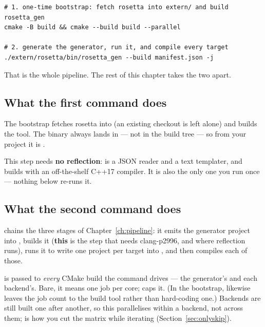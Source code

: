 \begin{lstlisting}[style=sh]
# 1. one-time bootstrap: fetch rosetta into extern/ and build rosetta_gen
cmake -B build && cmake --build build --parallel

# 2. generate the generator, run it, and compile every target
./extern/rosetta/bin/rosetta_gen --build manifest.json -j
\end{lstlisting}

That is the whole pipeline. The rest of this chapter takes the two apart.

\subsection*{What the first command does}

The bootstrap  fetches rosetta into  (an
existing checkout is left alone) and builds the  tool. The
binary always lands in  --- not in the build
tree --- so from your project it is .

This step needs \textbf{no reflection}:  is a JSON reader
and a text templater, and builds with an off-the-shelf C++17 compiler. It is
also the only one you run once --- nothing below re-runs it.

\subsection*{What the second command does}

 chains the three stages of Chapter~\ref{ch:pipeline}: it emits
the generator project into , builds it (\textbf{this} is the step
that needs clang-p2996, and where reflection runs), runs it to write one
project per target into , and then compiles each of those.

\begin{note}
 is passed to \emph{every} CMake build the command drives --- the
generator's and each backend's. Bare, it means one job per core; 
caps it. (In the bootstrap,  likewise leaves the job count to
the build tool rather than hard-coding one.)
Backends are still built one after another, so this parallelises within a
backend, not across them;  is how you cut the matrix
while iterating (Section~\ref{sec:onlyskip}).
\end{note}


